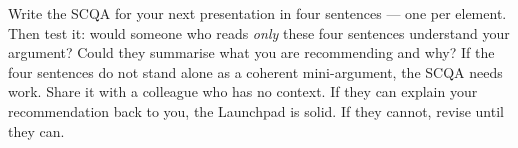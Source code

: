 
\begin{keybox}
Write the SCQA for your next presentation in four sentences --- one per element. Then test it: would someone who reads \emph{only} these four sentences understand your argument? Could they summarise what you are recommending and why? If the four sentences do not stand alone as a coherent mini-argument, the SCQA needs work. Share it with a colleague who has no context. If they can explain your recommendation back to you, the Launchpad is solid. If they cannot, revise until they can.
\end{keybox}

\clearpage
